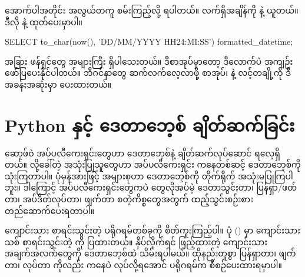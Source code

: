အောက်ပါအတိုင်း အလွယ်တကူ စမ်းကြည့်လို့ ရပါတယ်။ လက်ရှိအချိန်ကို  နဲ့ ယူတယ်။ ဒီလို   နဲ့ ထုတ်ပေးမှာပါ။
%
\begin{sql}
SELECT to_char(now(), 'DD/MM/YYYY HH24:MI:SS') formatted_datetime;
\end{sql}
%

အခြား ဖန်ရှင်တွေ အများကြီး ရှိပါသေးတယ်။ ဒီစာအုပ်မှာတော့ ဒီလောက်ပဲ အကျဉ်း ဖော်ပြပေးနိုင်ပါတယ်။ ဘီဂင်နာတွေ ဆက်လက်လေ့လာဖို့ စာအုပ်၊  နဲ့  လင့်တချို့ကို ဒီအခန်းအဆုံးမှာ ပေးထားတယ်။ 


\section{Python နှင့် ဒေတာဘေ့စ် ချိတ်ဆက်ခြင်း}
ဆော့ဖ်ဝဲ အပ်ပလီကေးရှင်းတွေဟာ ဒေတာဘေ့စ်နဲ့ ချိတ်ဆက်လုပ်ဆောင် ရလေ့ရှိတယ်။  လို့ခေါ်တဲ့ အသုံးပြုသူတွေဟာ အပ်ပလီကေးရှင်း  ကနေတစ်ဆင့် ဒေတာဘေ့စ်ကို သုံးကြတာပါ။ ပုံမှန်အားဖြင့်  အများစုဟာ ဒေတာဘေ့စ်ကို တိုက်ရိုက် အသုံးမပြုကြပါဘူး။ ဒါကြောင့် အပ်ပလီကေးရှင်းတွေကပဲ  တွေလိုအပ်မဲ့ ဒေတာသွင်းတာ၊ ပြန်ရှာ/ဖတ်တာ၊ အပ်ဒိတ်လုပ်တာ၊ ဖျက်တာ စတဲ့ကိစ္စတွေအတွက် ထည့်သွင်းစဉ်းစား တည်ဆောက်ပေးရတာပါ။ 

ကျောင်းသား စာရင်းသွင်းတဲ့ ပရိုဂရမ်တစ်ခုကို စိတ်ကူးကြည့်ပါ။ ပုံ (\fRefNo{\ref{fig:stuform}}) မှာ ကျောင်းသားသစ် စာရင်းသွင်းတဲ့  ကို ပြထားတယ်။  နှိပ်လိုက်ရင် ဖြည့်ထားတဲ့ ကျောင်းသား အချက်အလက်တွေကို ဒေတာဘေ့စ်ထဲ သိမ်းရပါမယ်။ ထိုနည်းတူစွာ ပြန်ရှာတာ၊ ဖျက်တာ၊  လုပ်တာ ကိုလည်း  ကနေပဲ လုပ်လို့ရအောင် ပရိုဂရမ်က စီစဉ်ပေးထားရမှာပါ။ 
%
\begin{figure}[tbh!]
\caption{} 
\label{fig:stuform}
\end{figure}
%

